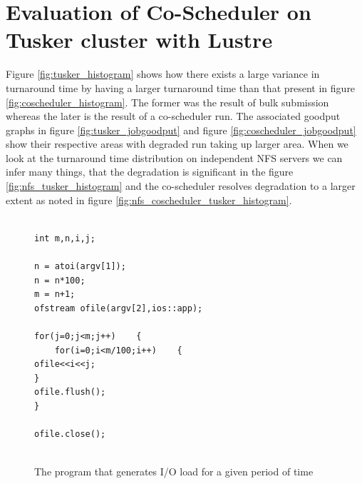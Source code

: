 \documentclass[ms,electronic,double]{nuthesis}
\begin{document}
\section{Evaluation of Co-Scheduler on Tusker cluster with Lustre}
Figure \ref{fig:tusker_histogram} shows how there exists a large variance in 
turnaround time by having a larger turnaround time than that present in figure 
\ref{fig:coscheduler_histogram}. The former was the result of bulk submission 
whereas the later is the result of a co-scheduler run. The associated goodput 
graphs in figure \ref{fig:tusker_jobgoodput} and figure \ref{fig:coscheduler_jobgoodput} 
show their respective areas with degraded run taking up larger area. When we look 
at the turnaround time distribution on independent NFS servers we can infer many 
things, that the degradation is significant in the figure \ref{fig:nfs_tusker_histogram} and the co-scheduler 
resolves degradation to a larger extent as noted in figure 
\ref{fig:nfs_coscheduler_tusker_histogram}.

\begin{figure}[htbp!]

\begin{lstlisting}

int m,n,i,j;

n = atoi(argv[1]);
n = n*100;
m = n+1;
ofstream ofile(argv[2],ios::app);

for(j=0;j<m;j++)	{
	for(i=0;i<m/100;i++)	{
ofile<<i<<j;
}
ofile.flush();
}

ofile.close();


\end{lstlisting}
\caption{The program that generates I/O load for a given period of time}
\label{fig:ioload}
\end{figure}
\FloatBarrier
\end{document}
